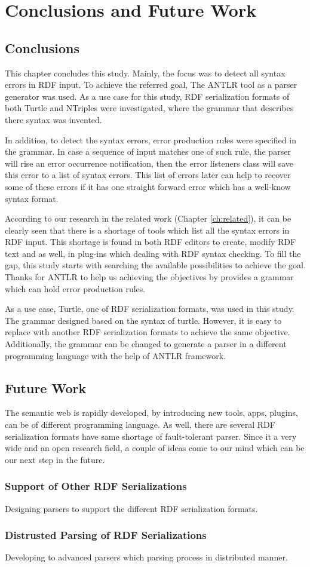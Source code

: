 \chapter{Conclusions and Future Work}
\label{ch:conclusions}

\section{Conclusions}
This chapter concludes this study. Mainly, the focus was to detect all syntax errors in RDF input. To achieve the referred goal, The ANTLR tool as a parser generator was used. As a use case for this study, RDF serialization formats of both Turtle and NTriples were investigated, where the grammar that describes there syntax was invented.

In addition, to detect the syntax errors, error production rules were specified in the grammar. In case a sequence of input matches one of such rule, the parser will rise an error occurrence notification, then the error listeners class will save this error to a list of syntax errors. This list of errors later can help to recover some of these errors if it has one straight forward error which has a well-know syntax format. 

According to our research in the related work (Chapter \ref{ch:related}), it can be clearly seen that there is a shortage of tools which list all the syntax errors in RDF input. This shortage is found in both RDF editors to create, modify RDF text and as well, in plug-ins which dealing with RDF syntax checking. To fill the gap, this study starts with searching the available possibilities to achieve the goal. Thanks for ANTLR to help us achieving the objectives by provides a grammar which can hold error production rules. 

As a use case, Turtle, one of RDF serialization formats, was used in this study. The grammar designed based on the syntax of turtle. However, it is easy to replace with another RDF serialization formats to achieve the same objective. Additionally, the grammar can be changed to generate a parser in a different programming language with the help of ANTLR framework.   


\section{Future Work}
The semantic web is rapidly developed, by introducing new tools, apps, plugins, can be of different programming language. As well, there are several RDF serialization  formats have same shortage of fault-tolerant parser. 
Since it a very wide and an open research field, a couple of ideas come to our mind which can be our next step in the future. 
\subsection{Support of Other RDF Serializations}
     Designing parsers to support the different RDF serialization formats.

\subsection{Distrusted Parsing of RDF Serializations}
     Developing to advanced parsers which parsing process in distributed manner.


